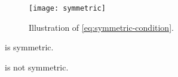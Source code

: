 \begin{figure}[h]
	\centering
	\texttt{[image: symmetric]}
	\caption{
		Illustration of \cref{eq:symmetric-condition}.
	}
	\label{fig:stacking-symmetric}
\end{figure}

\begin{example}
	\SetL is symmetric.
\end{example}

\begin{lemma}
	\Effects is not symmetric.
\end{lemma}

